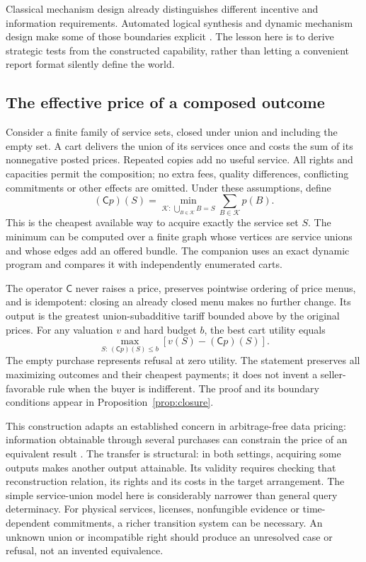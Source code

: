Classical mechanism design already distinguishes different incentive and information requirements. Automated logical synthesis and dynamic mechanism design make some of those boundaries explicit \cite{synthesis,dynamic}. The lesson here is to derive strategic tests from the constructed capability, rather than letting a convenient report format silently define the world.

\subsection{The effective price of a composed outcome}
Consider a finite family of service sets, closed under union and including the empty set. A cart delivers the union of its services once and costs the sum of its nonnegative posted prices. Repeated copies add no useful service. All rights and capacities permit the composition; no extra fees, quality differences, conflicting commitments or other effects are omitted. Under these assumptions, define
\begin{equation}
(\mathsf{C}p)(S)=
\min_{\mathcal K:\,\bigcup_{B\in\mathcal K}B=S}
\sum_{B\in\mathcal K}p(B).
\label{eq:closure}
\end{equation}
This is the cheapest available way to acquire exactly the service set $S$. The minimum can be computed over a finite graph whose vertices are service unions and whose edges add an offered bundle. The companion uses an exact dynamic program and compares it with independently enumerated carts.

The operator $\mathsf{C}$ never raises a price, preserves pointwise ordering of price menus, and is idempotent: closing an already closed menu makes no further change. Its output is the greatest union-subadditive tariff bounded above by the original prices. For any valuation $v$ and hard budget $b$, the best cart utility equals
\begin{equation}
\max_{S:\,(\mathsf{C}p)(S)\le b}
\left[v(S)-(\mathsf{C}p)(S)\right].
\label{eq:buyer}
\end{equation}
The empty purchase represents refusal at zero utility. The statement preserves all maximizing outcomes and their cheapest payments; it does not invent a seller-favorable rule when the buyer is indifferent. The proof and its boundary conditions appear in Proposition~\ref{prop:closure}.

This construction adapts an established concern in arbitrage-free data pricing: information obtainable through several purchases can constrain the price of an equivalent result \cite{datapr}. The transfer is structural: in both settings, acquiring some outputs makes another output attainable. Its validity requires checking that reconstruction relation, its rights and its costs in the target arrangement. The simple service-union model here is considerably narrower than general query determinacy. For physical services, licenses, nonfungible evidence or time-dependent commitments, a richer transition system can be necessary. An unknown union or incompatible right should produce an unresolved case or refusal, not an invented equivalence.

